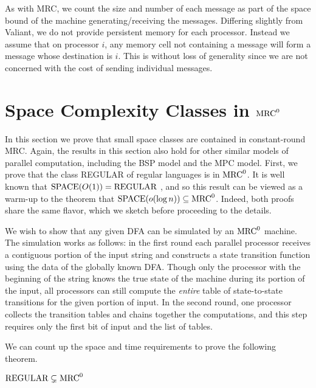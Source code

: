 \begin{remark}
As with MRC, we count the size and number of each message as part of the space
bound of the machine generating/receiving the messages. Differing slightly from
Valiant, we do not provide persistent memory for each processor. Instead we
assume that on processor $i$, any memory cell not containing a message will
form a message whose destination is $i$. This is without loss of generality
since we are not concerned with the cost of sending individual messages.
\end{remark}


\section{Space Complexity Classes in $\textup{MRC}^0$} \label{sec:spacebound}

In this section we prove that small space classes are contained in
constant-round MRC.  Again, the results in this section also hold for other
similar models of parallel computation, including the BSP model and the MPC model.
First, we prove that the class REGULAR of regular languages
is in $\textup{MRC}^0$. It is well known that $\textup{SPACE}(O(1)) = \textup{REGULAR}$
\cite{Shepherdson59}, and so this result can be viewed as a warm-up to the
theorem that $\textup{SPACE}(o(\log n)) \subseteq \textup{MRC}^0$. Indeed, both proofs
share the same flavor, which we sketch before proceeding to the details.

We wish to show that any given DFA can be simulated by an $\textup{MRC}^0$ machine.
The simulation works as follows:
in the first round each parallel processor receives a contiguous portion of the
input string and constructs a state transition function using the data of the
globally known DFA. Though only the processor with the beginning of the string
knows the true state of the machine during its portion of the input, all
processors can still compute the \emph{entire} table of state-to-state
transitions for the given portion of input. In the second round, one processor
collects the transition tables and chains together the computations, and this
step requires only the first bit of input and the list of tables.

We can count up the space and time requirements to prove the following theorem.

\begin{theorem}\label{thm:reg}
   $\textup{REGULAR} \subsetneq \textup{MRC}^0$
\end{theorem}

